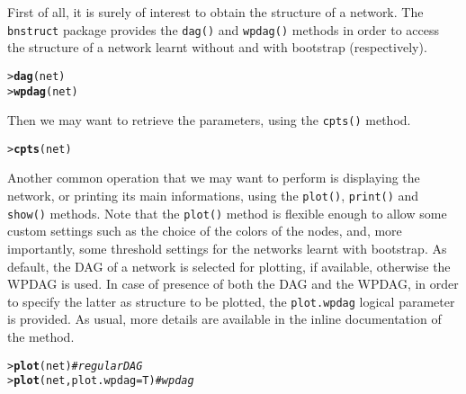 \documentclass{article}\usepackage[]{graphicx}\usepackage[]{color}
\makeatletter
\newcommand{\hlcom}[1]{\textcolor[rgb]{0.678,0.584,0.686}{\textit{#1}}}%
\newcommand{\hlstd}[1]{\textcolor[rgb]{0.345,0.345,0.345}{#1}}%
\newcommand{\hlkwc}[1]{\textcolor[rgb]{0.333,0.667,0.333}{#1}}%
\newcommand{\hlkwd}[1]{\textcolor[rgb]{0.737,0.353,0.396}{\textbf{#1}}}%
\newenvironment{kframe}{%
 \def\at@end@of@kframe{}%
 \ifinner\ifhmode%
  \def\at@end@of@kframe{\end{minipage}}%
  \begin{minipage}{\columnwidth}%
 \fi\fi%
 \def\FrameCommand##1{\hskip\@totalleftmargin \hskip-\fboxsep
 \colorbox{shadecolor}{##1}\hskip-\fboxsep
     \hskip-\linewidth \hskip-\@totalleftmargin \hskip\columnwidth}%
 \MakeFramed {\advance\hsize-\width
   \@totalleftmargin\z@ \linewidth\hsize
   \@setminipage}}%
 {\par\unskip\endMakeFramed%
 \at@end@of@kframe}
\newenvironment{knitrout}{}{} %
\newcommand{\Rpackage}[1]{{\texttt{#1}}}
\newcommand{\Rmethod}[1]{{\texttt{#1}}}
\newcommand{\Rfunarg}[1]{{\texttt{#1}}}
\makeatother
\begin{document}
First of all, it is surely of interest to obtain the structure of a network. The \Rpackage{bnstruct} package
provides the \Rmethod{dag()} and \Rmethod{wpdag()} methods in order to access the structure of a network learnt without and
with bootstrap (respectively).
\begin{knitrout}
\color{fgcolor}\begin{kframe}
\begin{alltt}
\hlstd{> }\hlkwd{dag}\hlstd{(net)}
\hlstd{> }\hlkwd{wpdag}\hlstd{(net)}
\end{alltt}
\end{kframe}
\end{knitrout}

Then we may want to retrieve the parameters, using the \Rmethod{cpts()} method.
\begin{knitrout}
\color{fgcolor}\begin{kframe}
\begin{alltt}
\hlstd{> }\hlkwd{cpts}\hlstd{(net)}
\end{alltt}
\end{kframe}
\end{knitrout}

Another common operation that we may want to perform is displaying the network, or printing its main informations, using the
\Rmethod{plot()}, \Rmethod{print()} and \Rmethod{show()} methods. Note that the \Rmethod{plot()} method is flexible enough to allow 
some custom settings such as the choice of the colors of the nodes, and, more importantly, some threshold settings 
for the networks learnt with bootstrap. As default, the DAG of a network is selected for plotting, if available,
otherwise the WPDAG is used. In case of presence of both the DAG and the WPDAG, in order to specify the latter as
structure to be plotted, the \Rfunarg{plot.wpdag} logical parameter is provided. As usual, more details are available
in the inline documentation of the method.
\begin{knitrout}
\color{fgcolor}\begin{kframe}
\begin{alltt}
\hlstd{> }\hlkwd{plot}\hlstd{(net)} \hlcom{# regular DAG}
\hlstd{> }\hlkwd{plot}\hlstd{(net,} \hlkwc{plot.wpdag}\hlstd{=T)} \hlcom{# wpdag}
\end{alltt}
\end{kframe}
\end{knitrout}
\end{document}
